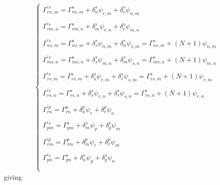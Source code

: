 \begin{align}
\left\{\begin{matrix}
\Gamma^{'s}_{rn,m} = \Gamma^{s}_{rn,m} +\delta^s_n\psi_{r,m} +\delta^s_r\psi_{n,m}\\\\
\Gamma^{'s}_{rm,n} = \Gamma^{s}_{rm,n} +\delta^s_m\psi_{r,n} +\delta^s_r\psi_{m,n}\\\\
\Gamma^{'s}_{ns,m} = \Gamma^{s}_{ns,m} +\delta^s_s\psi_{n,m} +\delta^s_n\psi_{s,m}= \Gamma^{s}_{ns,m} +\left(N+1\right)\psi_{n,m} \\\\
\Gamma^{'s}_{ms,n} = \Gamma^{s}_{ms,n} +\delta^s_s\psi_{m,n} +\delta^s_m\psi_{s,n}= \Gamma^{s}_{ms,n} +\left(N+1\right)\psi_{m,n} \\\\
\Gamma^{'s}_{rs,m} = \Gamma^{s}_{rs,m} +\delta^s_s\psi_{r,m} +\delta^s_r\psi_{s,m}= \Gamma^{s}_{rs,m} +\left(N+1\right)\psi_{r,m} \\\\
\Gamma^{'s}_{rs,n} = \Gamma^{s}_{rs,n} +\delta^s_s\psi_{r,n} +\delta^s_r\psi_{s,n}= \Gamma^{s}_{rs,n} +\left(N+1\right)\psi_{r,n} \\\\
\Gamma^{'p}_{rn} = \Gamma^{p}_{rn} +\delta^p_n\psi_r +\delta^p_r\psi_n\\\\
\Gamma^{'s}_{pm} = \Gamma^{s}_{pm} +\delta^s_m\psi_p +\delta^s_p\psi_m\\\\
\Gamma^{'p}_{rm} = \Gamma^{p}_{rm} +\delta^p_m\psi_r +\delta^p_r\psi_m\\\\
\Gamma^{'s}_{pn} = \Gamma^{s}_{pn} +\delta^s_n\psi_p +\delta^s_p\psi_n\\\\
\end{matrix}\right.
\end{align}
giving
